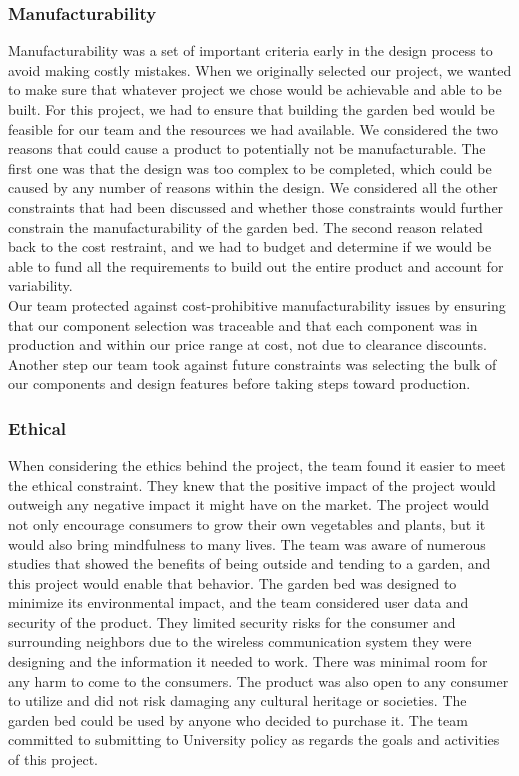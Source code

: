 \subsubsection{Manufacturability}
Manufacturability was a set of important criteria early in the design process to avoid making costly mistakes. When we originally selected our project, we wanted to make sure that whatever project we chose would be achievable and able to be built. For this project, we had to ensure that building the garden bed would be feasible for our team and the resources we had available. We considered the two reasons that could cause a product to potentially not be manufacturable. The first one was that the design was too complex to be completed, which could be caused by any number of reasons within the design. We considered all the other constraints that had been discussed and whether those constraints would further constrain the manufacturability of the garden bed. The second reason related back to the cost restraint, and we had to budget and determine if we would be able to fund all the requirements to build out the entire product and account for variability.\\

Our team protected against cost-prohibitive manufacturability issues by ensuring that our component selection was traceable and that each component was in production and within our price range at cost, not due to clearance discounts. Another step our team took against future constraints was selecting the bulk of our components and design features before taking steps toward production.\\
\subsubsection{Ethical}
When considering the ethics behind the project, the team found it easier to meet the ethical constraint. They knew that the positive impact of the project would outweigh any negative impact it might have on the market. The project would not only encourage consumers to grow their own vegetables and plants, but it would also bring mindfulness to many lives. The team was aware of numerous studies that showed the benefits of being outside and tending to a garden, and this project would enable that behavior. The garden bed was designed to minimize its environmental impact, and the team considered user data and security of the product. They limited security risks for the consumer and surrounding neighbors due to the wireless communication system they were designing and the information it needed to work. There was minimal room for any harm to come to the consumers. The product was also open to any consumer to utilize and did not risk damaging any cultural heritage or societies. The garden bed could be used by anyone who decided to purchase it. The team committed to submitting to University policy as regards the goals and activities of this project.\\
